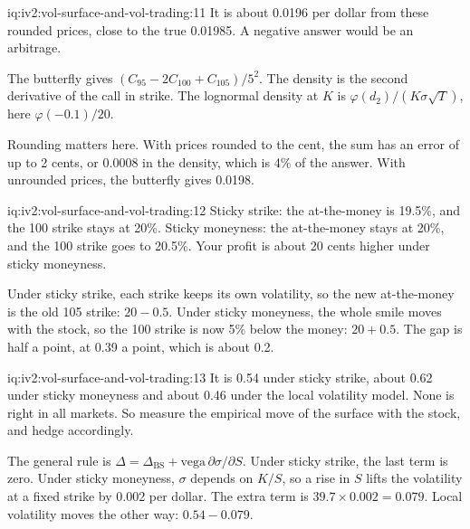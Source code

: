 \begin{solution}{iq:iv2:vol-surface-and-vol-trading:11}
It is about 0.0196 per dollar from these rounded prices, close to the true 0.01985. A negative answer would be an arbitrage.

The butterfly gives $(C_{95} - 2C_{100} + C_{105})/5^2$. The density is the second derivative of the call in strike. The lognormal density at $K$ is $\varphi(d_2)/(K\sigma\sqrt T)$, here $\varphi(-0.1)/20$.

Rounding matters here. With prices rounded to the cent, the sum has an error of up to 2 cents, or 0.0008 in the density, which is 4\% of the answer. With unrounded prices, the butterfly gives 0.0198.

\end{solution}

\begin{solution}{iq:iv2:vol-surface-and-vol-trading:12}
Sticky strike: the at-the-money is 19.5\%, and the 100 strike stays at 20\%. Sticky moneyness: the at-the-money stays at 20\%, and the 100 strike goes to 20.5\%. Your profit is about 20 cents higher under sticky moneyness.

Under sticky strike, each strike keeps its own volatility, so the new at-the-money is the old 105 strike: $20 - 0.5$. Under sticky moneyness, the whole smile moves with the stock, so the 100 strike is now 5\% below the money: $20 + 0.5$. The gap is half a point, at 0.39 a point, which is about 0.2.

\end{solution}

\begin{solution}{iq:iv2:vol-surface-and-vol-trading:13}
It is 0.54 under sticky strike, about 0.62 under sticky moneyness and about 0.46 under the local volatility model. None is right in all markets. So measure the empirical move of the surface with the stock, and hedge accordingly.

The general rule is $\Delta = \Delta_{\text{BS}} + \text{vega}\,\partial\sigma/\partial S$. Under sticky strike, the last term is zero. Under sticky moneyness, $\sigma$ depends on $K/S$, so a rise in $S$ lifts the volatility at a fixed strike by 0.002 per dollar. The extra term is $39.7 \times 0.002 = 0.079$. Local volatility moves the other way: $0.54 - 0.079$.

\end{solution}

